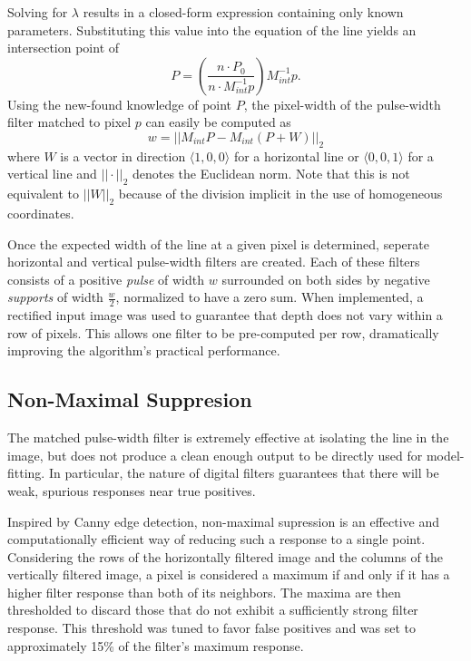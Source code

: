 \documentclass[11pt,twocolumn]{article}
\begin{document}
Solving for $\lambda$ results in a closed-form expression containing
only known parameters. Substituting this value into the equation of the
line yields an intersection point of
\begin{equation*}
 	P = \left(\frac{n \cdot P_0}{n \cdot M^{-1}_{int} p}\right) M^{-1}_{int} p.
	\label{eq:line-point}
\end{equation*}
Using the new-found knowledge of point $P$, the pixel-width of the pulse-width
filter matched to pixel $p$ can easily be computed as
\begin{equation*}
	w = ||M_{int} P - M_{int} (P + W)||_2
\end{equation*}
where $W$ is a vector in direction $\langle 1, 0, 0 \rangle$ for a horizontal
line or $\langle 0, 0, 1 \rangle$ for a vertical line and $||\cdot||_2$ denotes
the Euclidean norm. Note that this is not equivalent to $||W||_2$ because of
the division implicit in the use of homogeneous coordinates.

Once the expected width of the line at a given pixel is determined, seperate
horizontal and vertical pulse-width filters are created. Each of these filters
consists of a positive \textit{pulse} of width $w$ surrounded on both sides by
negative \textit{supports} of width $\frac{w}{2}$, normalized to have a zero
sum. When implemented, a rectified input image was used to guarantee that depth
does not vary within a row of pixels. This allows one filter to be pre-computed
per row, dramatically improving the algorithm's practical performance.


\subsection{Non-Maximal Suppresion}
\label{sec:line-nonmax}
The matched pulse-width filter is extremely effective at isolating the line in
the image, but does not produce a clean enough output to be directly used for
model-fitting. In particular, the nature of digital filters guarantees that
there will be weak, spurious responses near true positives.

Inspired by Canny edge detection, non-maximal supression is an effective and
computationally efficient way of reducing such a response to a single point.
Considering the rows of the horizontally filtered image and the columns of the
vertically filtered image, a pixel is considered a maximum if and only if it
has a higher filter response than both of its neighbors. The maxima are then
thresholded to discard those that do not exhibit a sufficiently strong filter
response. This threshold was tuned to favor false positives and was set to
approximately 15\% of the filter's maximum response.
\end{document}
